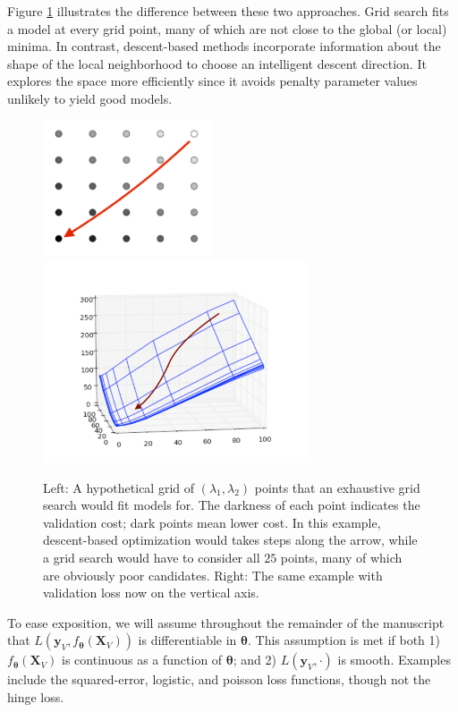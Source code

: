 \documentclass[12pt,letterpaper]{article}
\begin{document}
Figure \ref{fig:compare} illustrates the difference between these two approaches. Grid search fits a model at every grid point, many of which are not close to the global (or local) minima. In contrast, descent-based methods incorporate information about the shape of the local neighborhood to choose an intelligent descent direction. It explores the space more efficiently since it avoids penalty parameter values unlikely to yield good models.

\begin{figure}
\begin{center}
\includegraphics[height=40mm]{grid_search_vs_descent.pdf}
\includegraphics[height=60mm]{surface_in_regularization_parameters.pdf}
\end{center}
\caption{Left: A hypothetical grid of $(\lambda_1,\lambda_2)$ points that an exhaustive grid search would fit models for. The darkness of each point indicates the validation cost; dark points mean lower cost. In this example, descent-based optimization would takes steps along the arrow, while a grid search would have to consider all $25$ points, many of which are obviously poor candidates. Right: The same example with validation loss now on the vertical axis.}
\label{fig:compare}
\end{figure}

To ease exposition, we will assume throughout the remainder of the manuscript that $L \left( \boldsymbol{y}_V, f_{\boldsymbol \theta}(\boldsymbol{X}_V) \right)$ is differentiable in $\boldsymbol \theta$. This assumption is met if both 1) $f_{\boldsymbol \theta}(\boldsymbol{X}_V)$ is continuous as a function of $\boldsymbol \theta$; and 2) $L\left(\boldsymbol{y}_V,\cdot\right)$ is smooth. Examples include the squared-error, logistic, and poisson loss functions, though not the hinge loss.
\end{document}
